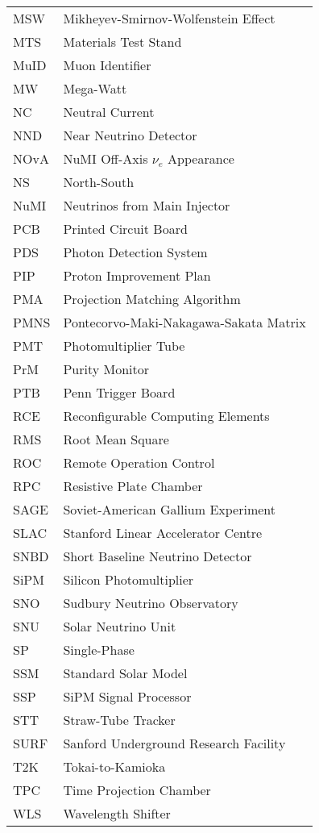 \begin{longtable}{l p{11cm}}
MSW         & Mikheyev-Smirnov-Wolfenstein Effect \\
MTS         & Materials Test Stand \\
MuID        & Muon Identifier \\
MW          & Mega-Watt \\
NC          & Neutral Current \\
NND         & Near Neutrino Detector \\
NOvA        & NuMI Off-Axis $\nu_e$ Appearance \\
NS          & North-South \\
NuMI        & Neutrinos from Main Injector \\
PCB         & Printed Circuit Board \\
PDS         & Photon Detection System \\
PIP         & Proton Improvement Plan \\
PMA         & Projection Matching Algorithm \\
PMNS        & Pontecorvo-Maki-Nakagawa-Sakata Matrix \\
PMT         & Photomultiplier Tube \\
PrM         & Purity Monitor \\
PTB         & Penn Trigger Board \\
RCE         & Reconfigurable Computing Elements \\
RMS         & Root Mean Square \\
ROC         & Remote Operation Control \\
RPC         & Resistive Plate Chamber \\
SAGE        & Soviet-American Gallium Experiment \\
SLAC        & Stanford Linear Accelerator Centre \\
SNBD        & Short Baseline Neutrino Detector \\
SiPM        & Silicon Photomultiplier \\
SNO         & Sudbury Neutrino Observatory \\
SNU         & Solar Neutrino Unit \\
SP          & Single-Phase \\
SSM         & Standard Solar Model \\
SSP         & SiPM Signal Processor \\
STT         & Straw-Tube Tracker \\
SURF        & Sanford Underground Research Facility \\
T2K         & Tokai-to-Kamioka \\
TPC         & Time Projection Chamber \\
WLS         & Wavelength Shifter \\
\end{longtable}


